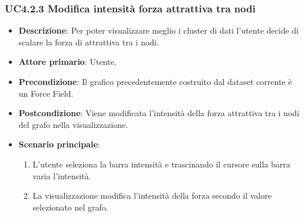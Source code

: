 \subsubsection{UC4.2.3 Modifica intensità forza attrattiva tra nodi}
\label{subsec:uc4.2.3}
\begin{itemize}
    \item \textbf{Descrizione}: Per poter visualizzare meglio i cluster di dati l’utente 
                                decide di scalare la forza di attrattiva tra i nodi.

	
    \item \textbf{Attore primario}: Utente.
    
    \item \textbf{Precondizione}:   Il grafico precedentemente costruito dal dataset corrente è un Force Field.
    \item \textbf{Postcondizione}:  Viene modificata l'intensità della forza attrattiva tra i nodi del grafo nella visualizzazione.

	\item \textbf{Scenario principale}:
        \begin{enumerate}
            \item L'utente seleziona la barra intensità e trascinando il cursore sulla barra varia l’intensità.
            \item La visualizzazione modifica l'intensità della forza secondo il valore selezionato nel grafo.
        \end{enumerate}
\end{itemize}

